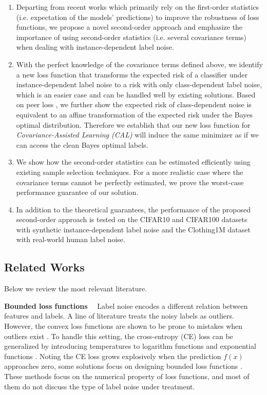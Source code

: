 \documentclass[final]{cvpr}
\newcommand{\rev}[1]{{\color{blue}#1}}
\newcommand{\rev}[1]{#1}
\newcounter{list}
\begin{document}
\begin{enumerate}[itemsep = -5pt, topsep = -7pt, leftmargin = 12pt]
    \item Departing from recent works \cite{sieve2020,liu2019peer,natarajan2013learning,patrini2017making,vahdat2017toward,xia2020parts,xiao2015learning} which primarily rely on the first-order statistics (i.e. expectation of the models' predictions) to improve the robustness of loss functions, we propose a novel second-order approach and emphasize the importance of using second-order statistics \rev{(i.e. several covariance terms)} when dealing with instance-dependent label noise. \item 
    \rev{With the perfect knowledge of the covariance terms defined above, we identify a new loss  function that transforms the expected risk of a classifier under instance-dependent label noise to a risk with only class-dependent label noise, which is an easier case and can be handled well by existing solutions. Based on peer loss \cite{liu2019peer}, we further show the expected risk of class-dependent noise is equivalent to an affine transformation of the expected risk under the Bayes optimal distribution.
    Therefore we establish that our new loss function for \emph{Covariance-Assisted Learning (CAL)} will induce the same minimizer as if we can access the clean Bayes optimal labels.}
    \item  We show how the second-order statistics can be estimated efficiently using existing sample selection techniques. For a more realistic case where the covariance terms cannot be perfectly estimated, we prove the worst-case performance guarantee of our solution. 
    \item In addition to the theoretical guarantees, the performance of the proposed second-order approach is tested on the CIFAR10 and CIFAR100 datasets with synthetic instance-dependent label noise and the Clothing1M dataset with real-world human label noise. 
\end{enumerate}




\subsection{Related Works}


Below we review the most relevant literature. 

\noindent\textbf{Bounded loss functions}~~
Label noise encodes a different relation between features and labels. A line of literature treats the noisy labels as outliers.
However, the convex loss functions are shown to be prone to mistakes when outliers exist \cite{long2010random}.
To handle this setting, the cross-entropy (CE) loss can be generalized by introducing temperatures to  logarithm functions and exponential functions \cite{amid2019robust,amid2019two,zhang2018generalized}.
Noting the CE loss grows explosively when the prediction $f(x)$ approaches zero, some solutions focus on designing bounded loss functions \cite{ghosh2017robust,gong2018decomposition,shu2020learning,wang2019symmetric}.
These methods focus on the numerical property of loss functions, and most of them do not discuss the type of label noise under treatment.
\end{document}
